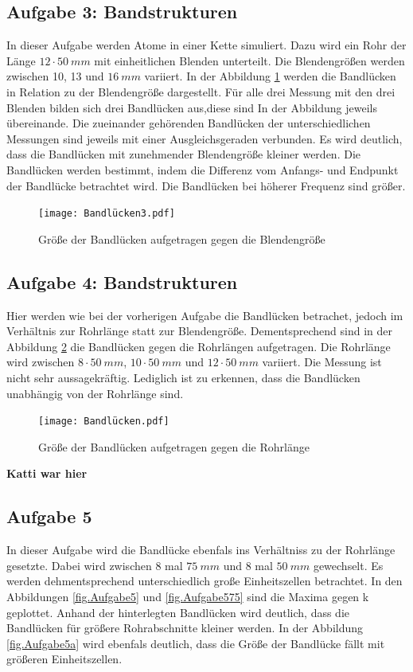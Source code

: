 \subsection{Aufgabe 3: Bandstrukturen}
\FloatBarrier
In dieser Aufgabe werden Atome in einer Kette simuliert.
Dazu wird ein Rohr der Länge $12 \cdot \SI{50}{mm}$ mit einheitlichen Blenden unterteilt.
Die Blendengrößen werden zwischen 10, 13 und $\SI{16}{mm}$ variiert.
In der Abbildung \ref{fig.Aufgabe3} werden die Bandlücken in Relation zu der Blendengröße dargestellt.
Für alle drei Messung mit den drei Blenden bilden sich drei Bandlücken aus,diese sind In der Abbildung jeweils übereinande.
Die zueinander gehörenden Bandlücken der unterschiedlichen Messungen sind jeweils mit einer Ausgleichsgeraden verbunden.
Es wird deutlich, dass die Bandlücken mit zunehmender Blendengröße kleiner werden.
Die Bandlücken werden bestimmt, indem die Differenz vom Anfangs- und Endpunkt der Bandlücke betrachtet wird.
Die Bandlücken bei höherer Frequenz sind größer.
\begin{figure}[h!]
  \centering
  \texttt{[image: Bandlücken3.pdf]}
  \caption{Größe der Bandlücken aufgetragen gegen die Blendengröße}
  \label{fig.Aufgabe3}
\end{figure}
\FloatBarrier

\subsection{Aufgabe 4: Bandstrukturen}
Hier werden wie bei der vorherigen Aufgabe die Bandlücken betrachet, jedoch im Verhältnis zur Rohrlänge statt zur Blendengröße.
Dementsprechend sind in der Abbildung \ref{fig.Aufgabe4} die Bandlücken gegen die Rohrlängen aufgetragen.
Die Rohrlänge wird zwischen $8 \cdot \SI{50}{mm}$, $10 \cdot \SI{50}{mm}$ und $12 \cdot \SI{50}{mm}$ variiert.
Die Messung ist nicht sehr aussagekräftig.
Lediglich ist zu erkennen, dass die Bandlücken unabhängig von der Rohrlänge sind.
\begin{figure}[h!]
  \centering
  \texttt{[image: Bandlücken.pdf]}
  \caption{Größe der Bandlücken aufgetragen gegen die Rohrlänge}
  \label{fig.Aufgabe4}
\end{figure}
\FloatBarrier


\textbf{\huge{Katti war hier}}

\subsection{Aufgabe 5}
In dieser Aufgabe wird die Bandlücke ebenfals ins Verhältniss zu der Rohrlänge gesetzte. Dabei wird zwischen 8 mal $\SI{75}{mm}$ und 8 mal $\SI{50}{mm}$ gewechselt.
Es werden dehmentsprechend unterschiedlich große Einheitszellen betrachtet.
In den Abbildungen \ref{fig.Aufgabe5} und \ref{fig.Aufgabe575} sind die Maxima gegen k geplottet. Anhand der hinterlegten Bandlücken wird deutlich, dass die Bandlücken für größere Rohrabschnitte kleiner werden.
In der Abbildung \ref{fig.Aufgabe5a} wird ebenfals deutlich, dass die Größe der Bandlücke fällt mit größeren Einheitszellen.

